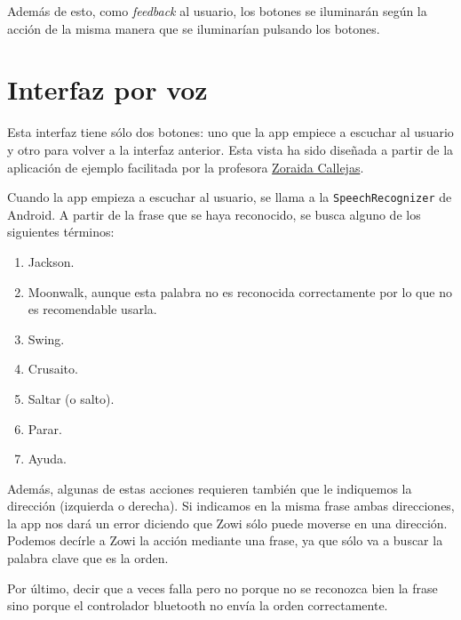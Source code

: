 \documentclass[10pt,a4paper,spanish]{article}
\begin{document}
Además de esto, como \textit{feedback} al usuario, los botones se iluminarán según la acción de la misma manera que se iluminarían pulsando los botones.

\section{\textcolor{denim}Interfaz por voz}
Esta interfaz tiene sólo dos botones: uno que la app empiece a escuchar al usuario y otro para volver a la interfaz anterior. Esta vista ha sido diseñada a partir de la aplicación de ejemplo facilitada por la profesora \href{https://github.com/zoraidacallejas}{Zoraida Callejas}.

Cuando la app empieza a escuchar al usuario, se llama a la \texttt{\textcolor{denim}{SpeechRecognizer}} de Android. A partir de la frase que se haya reconocido, se busca alguno de los siguientes términos:

\begin{enumerate}[\qquad\ \color{denim}{$\bullet$}]
    \item Jackson.
    \item Moonwalk, aunque esta palabra no es reconocida correctamente por lo que no es recomendable usarla.
    \item Swing.
    \item Crusaito.
    \item Saltar (o salto).
    \item Parar.
    \item Ayuda.
\end{enumerate}

Además, algunas de estas acciones requieren también que le indiquemos la dirección (izquierda o derecha). Si indicamos en la misma frase ambas direcciones, la app nos dará un error diciendo que Zowi sólo puede moverse en una dirección. Podemos decírle a Zowi la acción mediante una frase, ya que sólo va a buscar la palabra clave que es la orden.

Por último, decir que a veces falla pero no porque no se reconozca bien la frase sino porque el controlador bluetooth no envía la orden correctamente.
\end{document}
